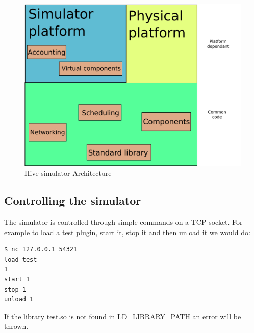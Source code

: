 \begin{figure}[htb]
  \begin{center}
    \includegraphics[scale=0.75]{img/bigarch.pdf}
    \caption{Hive simulator Architecture}
  \end{center}
\end{figure}


\subsection{Controlling the simulator}

The simulator is controlled through simple commands on a TCP socket. For
example to load a test plugin, start it, stop it and then unload it we would
do:
\begin{lstlisting}
$ nc 127.0.0.1 54321
load test
1
start 1
stop 1
unload 1
\end{lstlisting}

If the library test.so is not found in LD_LIBRARY_PATH an error will be
thrown.
